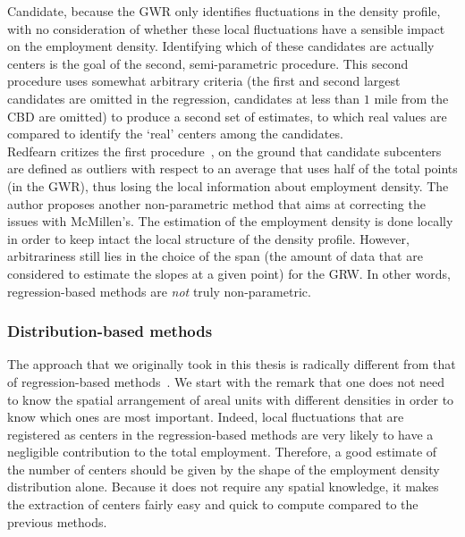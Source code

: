 Candidate, because the GWR only identifies fluctuations in the density profile,
with no consideration of whether these local fluctuations have a sensible impact
on the employment density. Identifying which of these candidates are actually
centers is the goal of the second, semi-parametric procedure. This second
procedure uses somewhat arbitrary criteria (the first and second largest
candidates are omitted in the regression, candidates at less than $1$ mile from
the CBD are omitted) to produce a second set of estimates, to which real values are
compared to identify the `real' centers among the candidates.\\

Redfearn critizes the first procedure~\cite{Redfearn:2007}, on the ground that candidate
subcenters are defined as outliers with respect to an average that uses half of the total
points (in the GWR), thus losing the local information about employment
density. The author proposes another non-parametric method that aims at correcting the issues
with McMillen's\cite{Redfearn:2007}. The estimation of the employment density is
done locally in order to keep intact the local structure of the density profile.
However, arbitrariness still lies in the choice of the span (the amount of data
that are considered to estimate the slopes at a given point) for the GRW. In
other words, regression-based methods are \emph{not} truly non-parametric.\\

\subsubsection{Distribution-based methods}
\label{ssub:distribution_based_methods}


The approach that we originally took in this thesis is radically different from
that of regression-based methods~\cite{Louf:2013_polycentric}. We start with the
remark that one does not need to know the spatial arrangement of areal units
with different densities in order to know which ones are most important. Indeed,
local fluctuations that are registered as centers in the regression-based
methods are very likely to have a negligible contribution to the total
employment. Therefore, a good estimate of the number of centers should be given
by the shape of the employment density distribution alone. Because it does not
require any spatial knowledge, it makes the extraction of centers fairly easy
and quick to compute compared to the previous methods.\\

